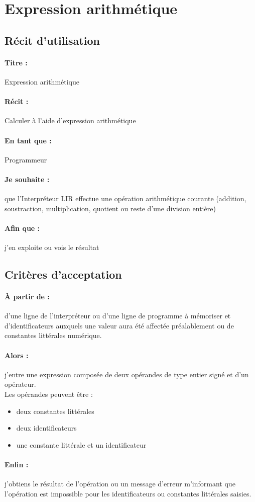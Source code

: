     \section{Expression arithmétique}
    \subsection*{Récit d'utilisation}

    \paragraph{Titre : } Expression arithmétique
    \paragraph{Récit : } Calculer à l'aide d'expression arithmétique
    \paragraph{En tant que : } Programmeur
    \paragraph{Je souhaite : } que l'Interpréteur LIR effectue une
    opération arithmétique courante (addition, soustraction,
    multiplication, quotient ou reste d'une division entière)
    \paragraph{Afin que : } j'en exploite ou vois le résultat

    \subsection*{Critères d'acceptation}

    \paragraph{À partir de : } d'une ligne de l'interpréteur ou d'une
    ligne de programme à mémoriser et d'identificateurs auxquels une
    valeur aura été affectée préalablement ou de constantes littérales
    numérique.

    \paragraph{Alors : } j'entre une expression composée de deux
    opérandes de type entier signé et d'un opérateur.
    \\ Les opérandes peuvent être :
    \begin{itemize}
        \item deux constantes littérales
        \item deux identificateurs
        \item une constante littérale et un identificateur
    \end{itemize}
    \paragraph{Enfin : } j'obtiens le résultat de l'opération ou un
    message d'erreur m'informant que l'opération est impossible pour les
    identificateurs ou constantes littérales saisies.
